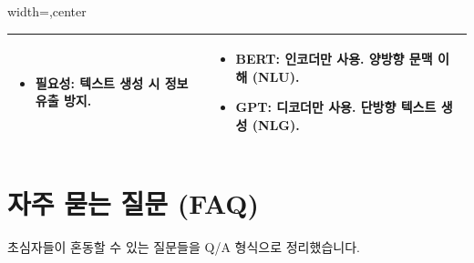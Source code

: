 \documentclass[11pt,a4paper]{article}
\begin{document}
\begin{adjustbox}{width=\textwidth,center}
\begin{tabular}{p{}p{}}
\begin{conceptbox}[title={마스크드 어텐션}]
\begin{itemize}
    \item \textbf{필요성:} 텍스트 생성 시 정보 유출 방지.
\end{itemize}
\end{conceptbox}
&
\begin{conceptbox}[title={트랜스포머의 활용}]
\begin{itemize}
    \item \textbf{BERT:} 인코더만 사용. 양방향 문맥 이해 (NLU).
    \item \textbf{GPT:} 디코더만 사용. 단방향 텍스트 생성 (NLG).
\end{itemize}
\end{conceptbox} \\
\bottomrule
\end{tabular}
\end{adjustbox}

\newpage
\section{자주 묻는 질문 (FAQ)}
초심자들이 혼동할 수 있는 질문들을 Q/A 형식으로 정리했습니다.
\end{document}
